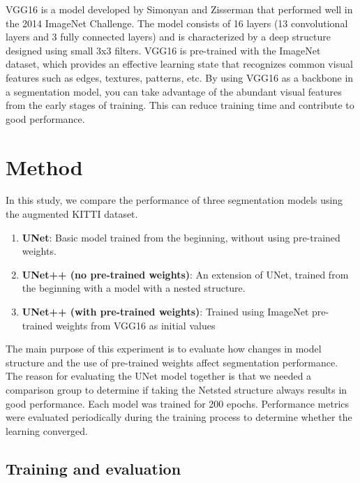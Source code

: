 \documentclass[10pt,twocolumn,letterpaper,final]{article} %
\begin{document}
VGG16 is a model developed by Simonyan and Zisserman that performed well in the 2014 ImageNet Challenge. The model consists of 16 layers (13 convolutional layers and 3 fully connected layers) and is characterized by a deep structure designed using small 3x3 filters. 
VGG16 is pre-trained with the ImageNet dataset, which provides an effective learning state that recognizes common visual features such as edges, textures, patterns, etc. 
By using VGG16 as a backbone in a segmentation model, you can take advantage of the abundant visual features from the early stages of training. This can reduce training time and contribute to good performance.


\section{Method}
\label{sec:intro}

In this study, we compare the performance of three segmentation models using the augmented KITTI dataset.
\begin{enumerate}
    \item \textbf{UNet}: Basic model trained from the beginning, without using pre-trained weights.
    
    \item \textbf{UNet++ (no pre-trained weights)}: An extension of UNet, trained from the beginning with a model with a nested structure.
    
    \item \textbf{UNet++ (with pre-trained weights)}: Trained using ImageNet pre-trained weights from VGG16 as initial values
\end{enumerate} The main purpose of this experiment is to evaluate how changes in model structure and the use of pre-trained weights affect segmentation performance. 
The reason for evaluating the UNet model together is that we needed a comparison group to determine if taking the Netsted structure always results in good performance. Each model was trained for 200 epochs. Performance metrics were evaluated periodically during the training process to determine whether the learning converged.
\subsection{Training and evaluation}
\end{document}

